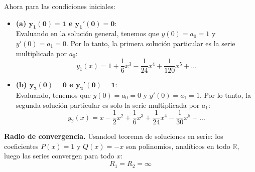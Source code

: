 \documentclass[11pt, a4paper]{article}
\begin{document}
Ahora para las condiciones iniciales:
\begin{itemize}
\item \textbf{(a) $\bm{y_1(0)=1}$ e $\bm{y_1'(0)=0}$}: \\
Evaluando en la solución general, tenemos que $y(0) = a_0 = 1$ y $y'(0) = a_1 = 0$. Por lo tanto, la primera solución particular es la serie multiplicada por $a_0$:
\[
\boxed{y_1(x) = 1 + \frac{1}{6}x^3 - \frac{1}{24}x^4 + \frac{1}{120}x^5 + \dots}
\]

\item \textbf{(b) $\bm{y_2(0)=0}$ e $\bm{y_2'(0)=1}$}: \\
Evaluando, tenemos que $y(0) = a_0 = 0$ y $y'(0) = a_1 = 1$. Por lo tanto, la segunda solución particular es solo la serie multiplicada por $a_1$:
\[
\boxed{y_2(x) = x - \frac{1}{2}x^2 + \frac{1}{6}x^3 + \frac{1}{24}x^4 - \frac{1}{30}x^5 + \dots}
\]
\end{itemize}
\textbf{Radio de convergencia.} Usandoel teorema de soluciones en serie: los coeficientes $P(x)=1$ y $Q(x)=-x$ son polinomios, analíticos en todo $\mathbb{R}$, luego las series convergen para todo $x$:
\[
R_1=R_2=\infty
\]
\end{document}
